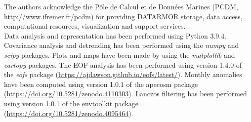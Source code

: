 \documentclass[review, 12pt]{elsarticle}
\begin{document}
The authors acknowledge the Pôle de Calcul et de Données Marines (PCDM, \url{http://www.ifremer.fr/pcdm}) for providing DATARMOR storage, data access, computational resources, visualization and support services.\\

Data analysis and representation has been performed using Python 3.9.4. 
Covariance analysis and detrending has been performed using the \emph{numpy} and \emph{scipy} packages. Plots and maps have been made by using the \emph{matplotlib} and \emph{cartopy} packages.
The EOF analysis has been performed using version 1.4.0 of the \emph{eofs} package (\url{https://ajdawson.github.io/eofs/latest/}). 
Monthly anomalies have been computed using version 1.0.1 of the apecosm package (\url{https://doi.org/10.5281/zenodo.4110303}).
Lanczos filtering has been performed using version 1.0.1 of the envtoolkit package (\url{https://doi.org/10.5281/zenodo.4095464}).

\listoffigures
\listoftables

\clearpage


\end{document}

